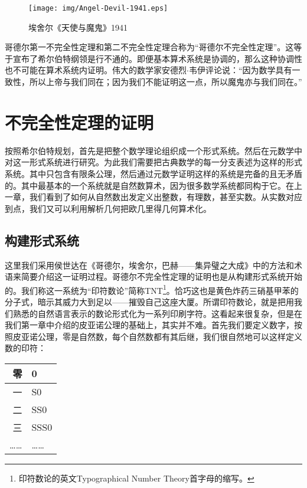 \documentclass{article}
\begin{document}
\begin{figure}[htbp]
 \centering
 \texttt{[image: img/Angel-Devil-1941.eps]}
 \caption{埃舍尔《天使与魔鬼》1941}
 \label{fig:Angel-Devil-1941}
\end{figure}

哥德尔第一不完全性定理和第二不完全性定理合称为“哥德尔不完全性定理”。这等于宣布了希尔伯特纲领是行不通的。即便基本算术系统是协调的，那么这种协调性也不可能在算术系统内证明。伟大的数学家安德烈$\cdot$韦伊评论说：“因为数学具有一致性，所以上帝与我们同在；因为我们不能证明这一点，所以魔鬼亦与我们同在。”\cite{HanXueTao16}

\section{不完全性定理的证明}

按照希尔伯特规划，首先是把整个数学理论组织成一个形式系统。然后在元数学中对这一形式系统进行研究。为此我们需要把古典数学的每一分支表述为这样的形式系统。其中只包含有限条公理，然后通过元数学证明这样的系统是完备的且无矛盾的。其中最基本的一个系统就是自然数算术，因为很多数学系统都同构于它。在上一章，我们看到了如何从自然数出发定义出整数，有理数，甚至实数。从实数对应到点，我们又可以利用解析几何把欧几里得几何算术化。

\subsection{构建形式系统}
 
这里我们采用侯世达在《哥德尔，埃舍尔，巴赫——集异璧之大成》中的方法和术语来简要介绍这一证明过程。哥德尔不完全性定理的证明也是从构建形式系统开始的。我们称这一系统为“印符数论”简称TNT\footnote{印符数论的英文Typographical Number Theory首字母的缩写。}。恰巧这也是黄色炸药三硝基甲苯的分子式，暗示其威力大到足以——摧毁自己这座大厦。所谓印符数论，就是把用我们熟悉的自然语言表示的数论形式化为一系列印刷字符。这看起来很复杂，但是在我们第一章中介绍的皮亚诺公理的基础上，其实并不难。首先我们要定义数字，按照皮亚诺公理，零是自然数，每个自然数都有其后继，我们很自然地可以这样定义数的印符：

\begin{tabular}{|r|l|}
零 & 0 \\
\hline
一 & S0 \\
\hline
二 & SS0 \\
\hline
三 & SSS0 \\
\hline
…… & …… \\
\end{tabular}
\end{document}
